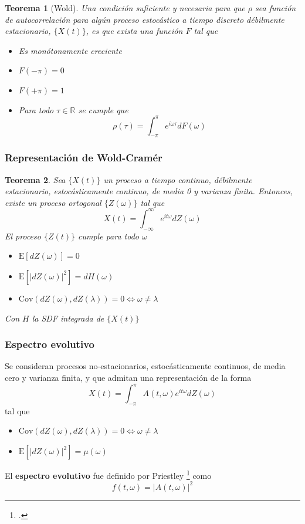 \documentclass{beamer}
\newtheorem{thrm}{Teorema}
\newcommand{\R}{\mathbb{R}}
\newcommand{\intR}{\int_{-\infty}^{\infty}}
\newcommand{\intPI}{\int_{-\pi}^{\pi}}
\newcommand{\E}[1]{\mathrm{E}\left[ #1 \right]}
\newcommand{\Cov}[1]{\mathrm{Cov}\left( #1 \right)}
\newcommand{\abso}[1]{\left| #1 \right|}
\begin{document}
\begin{frame}%
\begin{thrm}[Wold]
Una condici\'on suficiente y necesaria para que $\rho$ sea funci\'on de autocorrelaci\'on para
alg\'un proceso estoc\'astico a tiempo discreto d\'ebilmente estacionario, $\{X(t)\}$, es que 
exista una funci\'on $F$ tal que
\begin{itemize}
\item Es mon\'otonamente creciente
\item $F(-\pi) = 0$
\item $F(+\pi) = 1$
\item Para todo $\tau \in \R$ se cumple que
\begin{equation*}
\rho(\tau) = \intPI e^{i \omega \tau} dF(\omega)
\end{equation*}
\end{itemize}
\end{thrm}
\end{frame}


\begin{frame}\frametitle{Representaci\'on de Wold-Cram\'er}
\begin{thrm}
Sea $\{X(t)\}$ un proceso a tiempo continuo, d\'ebilmente estacionario, estoc\'asticamente 
continuo, de media 0 y varianza finita. Entonces, existe un proceso ortogonal $\{Z(\omega)\}$ tal 
que
\begin{equation*}
X(t) = \intR e^{i t \omega} dZ(\omega)
\end{equation*}
El proceso $\{Z(t)\}$ cumple para todo $\omega$
\begin{itemize}
\item $\E{dZ(\omega)} = 0$
\item $\E{\abso{dZ(\omega)}^{2}} = dH(\omega)$
\item $\Cov{dZ(\omega),dZ(\lambda)} = 0 \Leftrightarrow \omega \neq \lambda$
\end{itemize}
Con $H$ la SDF integrada de $\{X(t)\}$
\end{thrm}
\end{frame}

\begin{frame}\frametitle{Espectro evolutivo}
Se consideran procesos no-estacionarios, estoc\'asticamente continuos, de media cero y varianza 
finita, y que admitan una representaci\'on de la forma
\begin{equation*}
X(t) = \intPI A(t,\omega) e^{i t \omega} dZ(\omega)
\end{equation*}
tal que 
\begin{itemize}
\item $\Cov{dZ(\omega),dZ(\lambda)} = 0 \Leftrightarrow \omega \neq \lambda$
\item $\E{\abso{dZ(\omega)}^{2}} = \mu(\omega)$
\end{itemize}

El \textbf{espectro evolutivo} fue definido por Priestley \footcite{Priestley65} como
\begin{equation*}
f(t,\omega) = \abso{A(t,\omega)}^{2}
\end{equation*}
\end{frame}
\end{document}
